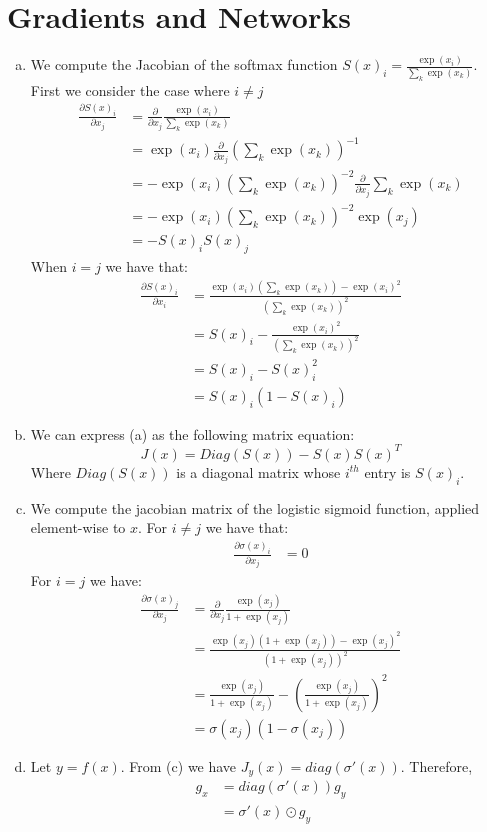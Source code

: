 \documentclass[paper=a4, fontsize=11pt]{scrartcl} %
\numberwithin{equation}{section} %
\numberwithin{figure}{section} %
\numberwithin{table}{section} %
\newcommand{\dP}[2]{\frac{\partial #1}{\partial #2}}
\begin{document}
\section{Gradients and Networks}
\begin{enumerate}[(a)]
	\item We compute the Jacobian of the softmax function $S(x)_i = \frac{\exp(x_i)}{\sum_k \exp(x_k)}$. First we consider the case where $i\ne j$
	\begin{align*}
	\dP{S(x)_i}{x_j} &= \dP{}{x_j}\frac{\exp(x_i)}{\sum_k \exp(x_k)}\\
	&=\exp(x_i)\dP{}{x_j}\left(\sum_k \exp(x_k)\right)^{-1}\\
	&=-\exp(x_i)\left(\sum_k \exp(x_k)\right)^{-2}\dP{}{x_j}\sum_k \exp(x_k)\\
	&=-\exp(x_i)\left(\sum_k \exp(x_k)\right)^{-2}\exp(x_j)\\
	&=-S(x)_iS(x)_j
	\end{align*}
	When $i=j$ we have that:
	\begin{align*}
	\dP{S(x)_i}{x_i} &= \frac{\exp(x_i)\left(\sum_k \exp(x_k)\right) - \exp(x_i)^2}{\left(\sum_k \exp(x_k)\right)^{2}}\\
	&= S(x)_i - \frac{\exp(x_i)^2}{\left(\sum_k \exp(x_k)\right)^{2}}\\
	&= S(x)_i - S(x)_i^2\\
	&= S(x)_i(1-S(x)_i)
	\end{align*}
	\item We can express (a) as the following matrix equation:
	$$ J(x) = Diag(S(x)) - S(x)S(x)^T$$
	Where $Diag(S(x))$ is a diagonal matrix whose $i^{th}$ entry is $S(x)_{i}$.
	\item We compute the jacobian matrix of the logistic sigmoid function, applied element-wise to $x$. For $i\ne j$ we have that:
	\begin{align*}
	\dP{\sigma(x)_i}{x_j} &= 0
	\end{align*}
	For $i=j$ we have:
	\begin{align*}
	\dP{\sigma(x)_j}{x_j} &= \dP{}{x_j}\frac{\exp(x_j)}{1 + \exp(x_j)}\\
	&= \frac{\exp(x_j)(1+\exp(x_j)) - \exp(x_j)^2}{(1 + \exp(x_j))^2}\\
	&= \frac{\exp(x_j)}{1+\exp(x_j)} - \left(\frac{\exp(x_j)}{1+\exp(x_j)}\right)^2\\
	&=\sigma(x_j)(1-\sigma(x_j))
	\end{align*}
	\item Let $y=f(x)$. From (c) we have $ J_y(x) = diag(\sigma'(x))$. Therefore, 
	\begin{align*}
	g_x &= diag(\sigma'(x))g_y \\
	&= \sigma'(x) \odot g_y
	\end{align*}
\end{enumerate}
\end{document}
